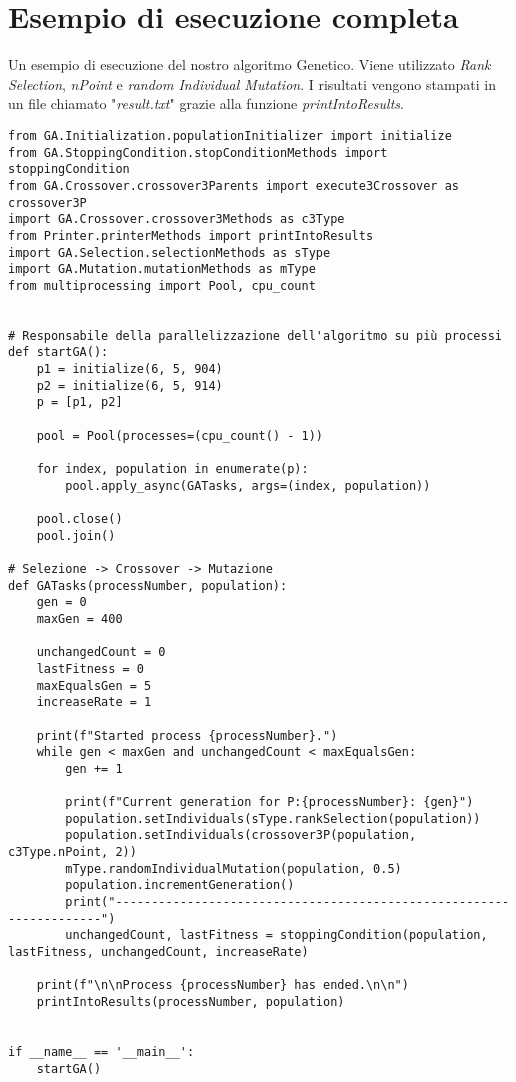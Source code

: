 \documentclass{article}
\begin{document}
\section{Esempio di esecuzione completa}
Un esempio di esecuzione del nostro algoritmo Genetico. Viene utilizzato \textit{Rank Selection}, \textit{nPoint} e \textit{random Individual Mutation}. I risultati vengono stampati in un file chiamato "\textit{result.txt}" grazie alla funzione \textit{printIntoResults}.
\begin{lstlisting}
from GA.Initialization.populationInitializer import initialize
from GA.StoppingCondition.stopConditionMethods import stoppingCondition
from GA.Crossover.crossover3Parents import execute3Crossover as crossover3P
import GA.Crossover.crossover3Methods as c3Type
from Printer.printerMethods import printIntoResults
import GA.Selection.selectionMethods as sType
import GA.Mutation.mutationMethods as mType
from multiprocessing import Pool, cpu_count


# Responsabile della parallelizzazione dell'algoritmo su più processi
def startGA():
    p1 = initialize(6, 5, 904)
    p2 = initialize(6, 5, 914)
    p = [p1, p2]

    pool = Pool(processes=(cpu_count() - 1))

    for index, population in enumerate(p):
        pool.apply_async(GATasks, args=(index, population))

    pool.close()
    pool.join()

# Selezione -> Crossover -> Mutazione
def GATasks(processNumber, population):
    gen = 0
    maxGen = 400

    unchangedCount = 0
    lastFitness = 0
    maxEqualsGen = 5
    increaseRate = 1

    print(f"Started process {processNumber}.")
    while gen < maxGen and unchangedCount < maxEqualsGen:
        gen += 1

        print(f"Current generation for P:{processNumber}: {gen}")
        population.setIndividuals(sType.rankSelection(population))
        population.setIndividuals(crossover3P(population, c3Type.nPoint, 2))
        mType.randomIndividualMutation(population, 0.5)
        population.incrementGeneration()
        print("--------------------------------------------------------------------")
        unchangedCount, lastFitness = stoppingCondition(population, lastFitness, unchangedCount, increaseRate)

    print(f"\n\nProcess {processNumber} has ended.\n\n")
    printIntoResults(processNumber, population)


if __name__ == '__main__':
    startGA()
\end{lstlisting}
\end{document}

